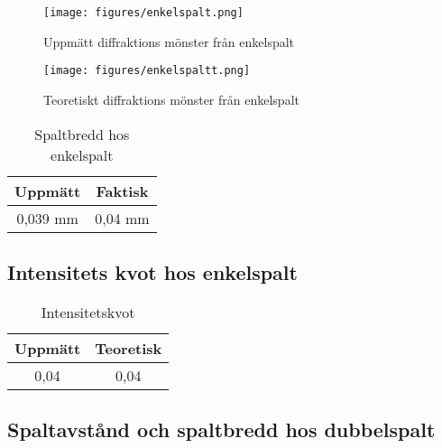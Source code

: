 \documentclass[a4paper]{article}
\begin{document}
\begin{figure}[H]
    \begin{small}
        \begin{center}
            \texttt{[image: figures/enkelspalt.png]}
        \end{center}
        \caption{Uppmätt diffraktions mönster från enkelspalt}
        \label{fig:enkelspalt}
    \end{small}
\end{figure}

\begin{figure}[H]
    \begin{small}
        \begin{center}
            \texttt{[image: figures/enkelspaltt.png]}
        \end{center}
        \caption{Teoretiskt diffraktions mönster från enkelspalt}
        \label{fig:enkelspaltt}
    \end{small}
\end{figure}

\begin{table}
    \caption{Spaltbredd hos enkelspalt}
    \label{tab:bred}
    \centering
    \begin{tabular}{c|c}
        Uppmätt & Faktisk \\
        \hline
        0,039 mm & 0,04 mm \\
    \end{tabular}
\end{table}



\subsection{Intensitets kvot hos enkelspalt}

\begin{table}
    \caption{Intensitetskvot}
    \label{tab:kvot}
    \centering
    \begin{tabular}{c|c}
        Uppmätt & Teoretisk \\
        \hline
        0,04 & 0,04 \\
    \end{tabular}
\end{table}



\subsection{Spaltavstånd och spaltbredd hos dubbelspalt}
\end{document}
